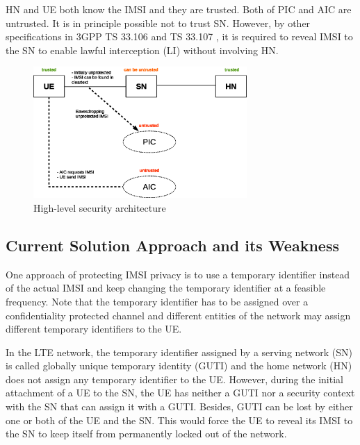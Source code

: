 \documentclass[runningheads,a4paper]{llncs} %
\begin{document}
HN and UE both know the IMSI and they are trusted. Both of PIC and AIC are untrusted. It is in principle possible not to trust SN. However, by other specifications in 3GPP TS 33.106 \cite{TS33106} and TS 33.107 \cite{TS33107}, it is required to reveal IMSI to the SN to enable lawful interception (LI) without involving HN. \begin{figure}

\begin{center}
  \includegraphics[height= 5cm]{security_architecture_abstraction.eps}
\caption{High-level security architecture}
\label{fig:security_architecture_abstraction}       %
\end{center}
\end{figure} 

\subsection{Current Solution Approach and its Weakness}
One approach of protecting IMSI privacy is to use a temporary identifier instead of the actual IMSI and keep changing the temporary identifier at a feasible frequency. Note that the temporary identifier has to be assigned over a confidentiality protected channel and different entities of the network may assign different temporary identifiers to the UE. 

In the LTE network, the temporary identifier assigned by a serving network (SN) is called globally unique temporary identity (GUTI) and the home network (HN) does not assign any temporary identifier to the UE. However, during the initial attachment of a UE to the SN, the UE has neither a GUTI nor a security context with the SN that can assign it with a GUTI. Besides, GUTI can be lost by either one or both of the UE and the SN. This would force the UE to reveal its IMSI to the SN to keep itself from permanently locked out of the network.
\end{document}
